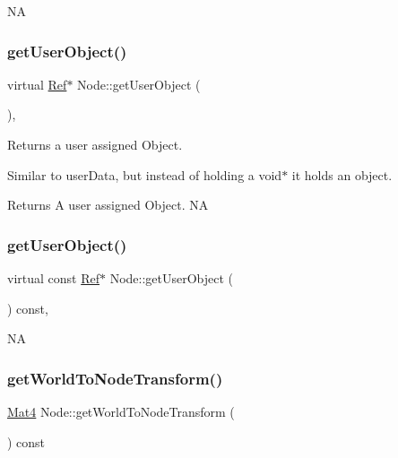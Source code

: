 NA \mbox{\label{classNode_a246218e1f2be9fc931be00c9c42a7817}} 
\subsubsection{\texorpdfstring{get\+User\+Object()}{getUserObject()}\hspace{0.1cm}{\footnotesize\ttfamily [3/4]}}
{\footnotesize\ttfamily virtual \hyperlink{classRef}{Ref}$\ast$ Node\+::get\+User\+Object (\begin{DoxyParamCaption}{ }\end{DoxyParamCaption})\hspace{0.3cm}{\ttfamily [inline]}, {\ttfamily [virtual]}}

Returns a user assigned Object.

Similar to user\+Data, but instead of holding a void$\ast$ it holds an object.

\begin{DoxyReturn}{Returns}
A user assigned Object.  NA 
\end{DoxyReturn}
\mbox{\label{classNode_a6bc05a48edd6e805bbe970fd62a4a48d}} 
\subsubsection{\texorpdfstring{get\+User\+Object()}{getUserObject()}\hspace{0.1cm}{\footnotesize\ttfamily [4/4]}}
{\footnotesize\ttfamily virtual const \hyperlink{classRef}{Ref}$\ast$ Node\+::get\+User\+Object (\begin{DoxyParamCaption}{ }\end{DoxyParamCaption}) const\hspace{0.3cm}{\ttfamily [inline]}, {\ttfamily [virtual]}}

NA \mbox{\label{classNode_ab41da5111de6d98710d0497e35063989}} 
\subsubsection{\texorpdfstring{get\+World\+To\+Node\+Transform()}{getWorldToNodeTransform()}\hspace{0.1cm}{\footnotesize\ttfamily [1/2]}}
{\footnotesize\ttfamily \hyperlink{classMat4}{Mat4} Node\+::get\+World\+To\+Node\+Transform (\begin{DoxyParamCaption}{ }\end{DoxyParamCaption}) const\hspace{0.3cm}{\ttfamily [virtual]}}

